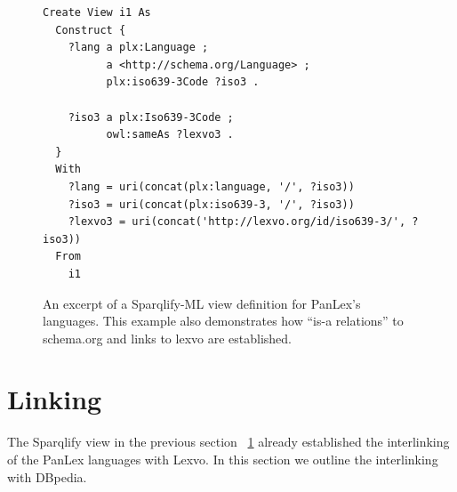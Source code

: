 \documentclass[sw]{iosart2c}
\begin{document}
\begin{figure}
\centering
\begin{lstlisting}[basicstyle=\footnotesize\ttfamily]
Create View i1 As
  Construct {
    ?lang a plx:Language ;
          a <http://schema.org/Language> ;
          plx:iso639-3Code ?iso3 .

    ?iso3 a plx:Iso639-3Code ;
          owl:sameAs ?lexvo3 .
  }
  With
    ?lang = uri(concat(plx:language, '/', ?iso3))
    ?iso3 = uri(concat(plx:iso639-3, '/', ?iso3))
    ?lexvo3 = uri(concat('http://lexvo.org/id/iso639-3/', ?iso3))
  From
    i1
\end{lstlisting}
\caption{An excerpt of a Sparqlify-ML view definition for PanLex's languages. This
example also demonstrates how ``is-a relations'' to schema.org and links to lexvo are established.}
\label{fig:ex:sparqlify-ml}
\end{figure}


\section{Linking}
\label{sec:linking}
The Sparqlify view in the previous section ~\ref{fig:ex:sparqlify-ml} already
established the interlinking of the PanLex languages with Lexvo.
In this section we outline the interlinking with DBpedia.

\end{document}
